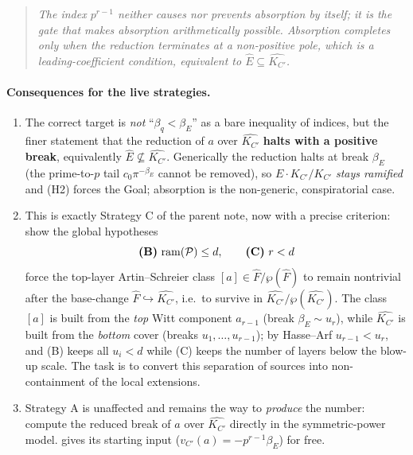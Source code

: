 \documentclass[11pt]{article}
\begin{document}
\begin{quote}\itshape
The index $p^{r-1}$ neither causes nor prevents absorption by itself; it is the
gate that makes absorption arithmetically possible. Absorption \emph{completes}
only when the reduction terminates at a non-positive pole, which is a
\emph{leading-coefficient} condition, equivalent to $\widehat E\subseteq
\widehat{K_{C'}}$.
\end{quote}

\paragraph{Consequences for the live strategies.}
\begin{enumerate}
  \item The correct target is \emph{not} ``$\beta_q<\beta_E$'' as a bare
        inequality of indices, but the finer statement that the reduction of $a$
        over $\widehat{K_{C'}}$ \textbf{halts with a positive break}, equivalently
        $\widehat E\not\subseteq\widehat{K_{C'}}$. Generically the reduction
        halts at break $\beta_E$ (the prime-to-$p$ tail $c_0\pi^{-\beta_E}$
        cannot be removed), so $E\cdot K_{C'}/K_{C'}$ \emph{stays ramified} and
        (H2) forces the Goal; absorption is the non-generic, conspiratorial
        case.
  \item This is exactly Strategy C of the parent note, now with a precise
        criterion: show the global hypotheses
        \[
        \textbf{(B)}\ \mathrm{ram}(\mathcal{P})\le d,\qquad \textbf{(C)}\ r<d
        \]
        force the top-layer Artin--Schreier class $[a]\in
        \widehat F/\wp(\widehat F)$ to remain nontrivial after the base-change
        $\widehat F\hookrightarrow\widehat{K_{C'}}$, i.e.\ to survive in
        $\widehat{K_{C'}}/\wp(\widehat{K_{C'}})$. The class $[a]$ is built from
        the \emph{top} Witt component $a_{r-1}$ (break $\beta_E\sim u_r$), while
        $\widehat{K_{C'}}$ is built from the \emph{bottom} cover (breaks
        $u_1,\dots,u_{r-1}$); by Hasse--Arf $u_{r-1}<u_r$, and (B) keeps all
        $u_i<d$ while (C) keeps the number of layers below the blow-up scale.
        The task is to convert this separation of sources into non-containment
        of the local extensions.
  \item Strategy A is unaffected and remains the way to \emph{produce} the
        number: compute the reduced break of $a$ over $\widehat{K_{C'}}$ directly
        in the symmetric-power model.  gives its starting input
        ($v_{C'}(a)=-p^{r-1}\beta_E$) for free.
\end{enumerate}
\end{document}
